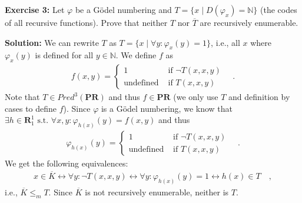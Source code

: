 \documentclass [11pt]{article}
\newcommand{\N}{\ensuremath{\mathbb{N}}}
\newcommand{\PR}{\textbf{PR}}
\newcommand{\R}{\textbf{R}}
\newcommand{\lra}{\ensuremath{\leftrightarrow}}
\begin{document}
\bigskip
\noindent
\textbf{Exercise 3:} Let $\varphi$ be a G\"odel numbering and $T = \{ x \mid D(\varphi_x) = \N\}$ (the codes of all recursive functions). Prove that neither $T$ nor $\overline{T}$ are recursively enumerable.

\noindent
\textbf{Solution:}
We can rewrite $T$ as $T = \{ x \mid \forall y: \varphi_x(y) = 1 \}$, i.e., all $x$  where $\varphi_x(y)$ is defined for all $y \in \N$.
We define $f$ as 
\begin{align*}
 f(x,y) = \begin{cases}
           1 & \text{ if } \neg T(x,x,y) \\
           \text{undefined} &\text{ if } T(x,x,y)
          \end{cases} \quad .
\end{align*} 
Note that $T \in Pred^3(\PR)$ and thus $f \in \PR$ (we only use $T$ and definition by cases to define $f$).
Since $\varphi$ is a G\"odel numbering, we know that $\exists h \in \R_1^1 \text{ s.t.\ } \forall x,y :\varphi_{h(x)}(y) = f(x,y)$ and thus
\begin{align*}
\varphi_{h(x)}(y) = \begin{cases}
           1 & \text{ if } \neg T(x,x,y) \\
           \text{undefined} &\text{ if } T(x,x,y)
          \end{cases} \quad .
\end{align*} 
We get the following equivalences:
\begin{align*}
x\in \overline{K} \lra \forall y: \neg T(x,x,y) \lra \forall y: \varphi_{h(x)}(y) = 1 \lra h(x) \in T \quad , 
\end{align*}
i.e., $\overline{K} \leq_m T$. 
Since $\overline{K}$ is not recursively enumerable, neither is $T$.
\end{document}
